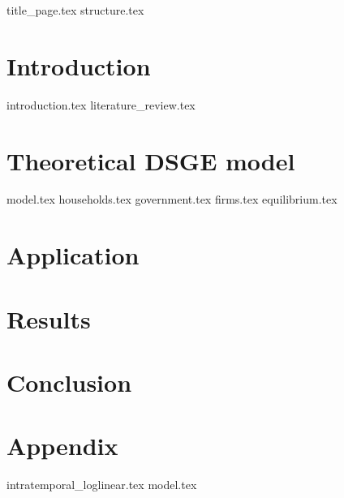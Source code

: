 \documentclass[12pt]{article}
\begin{document}
\begin{sloppypar}
{title_page.tex}
\pagebreak
{structure.tex}
\pagebreak
{}
\section{Introduction}
{introduction.tex}
{literature_review.tex}

\section{Theoretical DSGE model}
{model.tex}
{households.tex}
{government.tex}
{firms.tex}
{equilibrium.tex}
\section{Application} \label{application}
\section{Results}
\section{Conclusion}
\section{Appendix}
\appendix 
\renewcommand{\theequation}{A.\arabic{equation}}
{intratemporal_loglinear.tex}
{model.tex}

\end{sloppypar}
\end{document}
